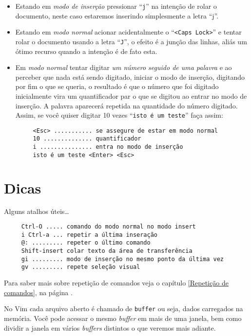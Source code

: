 \begin{itemize}

\item Estando em {\em{modo de inserção}} pressionar ``\verb+j+'' na intenção
de rolar o documento, neste caso estaremos inserindo simplesmente a letra ``j''. 

\item Estando em {\em{modo normal}} acionar acidentalmente o ``\verb+<Caps Lock>+'' 
e tentar rolar o documento usando a letra ``\verb+J+'', o efeito é a
junção das linhas, aliás um ótimo recurso quando a intenção é de fato esta.

\item Em {\em{modo normal}} tentar digitar {\em{um número seguido de uma palavra}} e ao perceber que 
nada está sendo digitado, iniciar o modo de inserção, digitando por fim o que se queria, 
o resultado é que o número que foi digitado inicialmente vira um quantificador par o que 
se digitou ao entrar no modo de inserção. A palavra aparecerá repetida na quantidade do 
número digitado. Assim, se você quiser digitar 10 vezes ``\verb+isto é um teste+''
 faça assim:

\begin{verbatim}
     <Esc> ........... se assegure de estar em modo normal
     10 .............. quantificador
     i ............... entra no modo de inserção
     isto é um teste <Enter> <Esc>  
\end{verbatim}

\end{itemize}


\section{Dicas}
\label{Dicas}
Alguns atalhos úteis\dots
\begin{verbatim}
     Ctrl-O ..... comando do modo normal no modo insert
     i Ctrl-a ... repetir a última inseração
     @: ......... repeter o último comando
     Shift-insert colar texto da área de transferência
     gi ......... modo de inserção no mesmo ponto da última vez
     gv ......... repete seleção visual
\end{verbatim}

Para saber mais sobre repetição de comandos veja o capítulo \ref{Repetição de comandos},
na página \pageref{Repetição de comandos}.

No Vim cada arquivo aberto é chamado de \verb|buffer| ou seja, dados
carregados na memória. Você pode acessar o mesmo {\em buffer} em mais de uma
janela, bem como dividir a janela em vários {\em buffers} distintos o que veremos
mais adiante.


